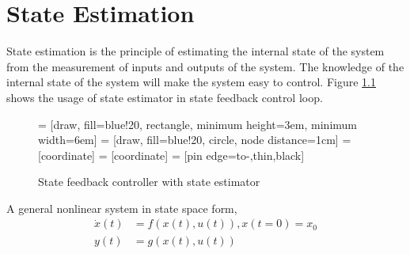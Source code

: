 \chapter{State Estimation}
\label{ch:st_est}
State estimation is the principle of estimating the internal state of the system from the measurement of inputs and outputs of the system. The knowledge of the internal state of the system will make the system easy to control. Figure \ref{fig:observer} shows the usage of state estimator in state feedback control loop.
\begin{figure}[h]
 = [draw, fill=blue!20, rectangle, 
    minimum height=3em, minimum width=6em]
 = [draw, fill=blue!20, circle, node distance=1cm]
 = [coordinate]
 = [coordinate]
 = [pin edge={to-,thin,black}]
\def\blockdist{2.3}
    \caption{State feedback controller with state estimator}
      \label{fig:observer}
\end{figure}

A general nonlinear system in state space form,
\begin{equation}
\begin{split}
\label{eqn:nl_sys}
\dot{x}(t) &= f(x(t),u(t)) , x(t=0) = x_0 \\
y(t) &= g(x(t),u(t))
\end{split}
\end{equation}

